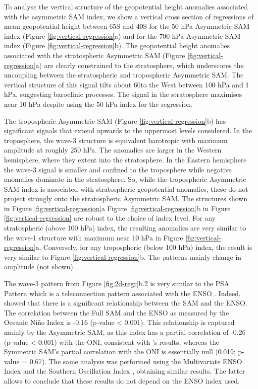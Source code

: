 \documentclass[smallextended]{svjour3}       %
\begin{document}
To analyse the vertical structure of the geopotential height anomalies associated with the asymmetric SAM index, we show a vertical cross section of regressions of mean geopotential height between 65\degree S and 40\degree S for the 50 hPa Asymmetric SAM index (Figure \ref{fig:vertical-regression}a) and for the 700 hPa Asymmetric SAM index (Figure \ref{fig:vertical-regression}b). The geopotential height anomalies associated with the stratospheric Asymmetric SAM (Figure \ref{fig:vertical-regression}a) are clearly constrained to the stratosphere, which underscores the uncoupling between the stratospheric and tropospheric Asymmetric SAM. The vertical structure of this signal tilts about 60\degree to the West between 100 hPa and 1 hPa, suggesting baroclinic processes. The signal in the stratosphere maximises near 10 hPa despite using the 50 hPa index for the regression.

The tropospheric Asymmetric SAM (Figure \ref{fig:vertical-regression}b) has significant signals that extend upwards to the uppermost levels considered. In the troposphere, the wave-3 structure is equivalent barotropic with maximum amplitude at roughly 250 hPa. The anomalies are larger in the Western hemisphere, where they extent into the stratosphere. In the Eastern hemisphere the wave-3 signal is smaller and confined to the troposphere while negative anomalies dominate in the stratosphere. So, while the tropospheric Asymmetric SAM index is associated with stratospheric geopotential anomalies, these do not project strongly onto the stratospheric Asymmetric SAM. The structures shown in Figure \ref{fig:vertical-regression}a Figure \ref{fig:vertical-regression}b in Figure \ref{fig:vertical-regression} are robust to the choice of index level. For any stratospheric (above 100 hPa) index, the resulting anomalies are very similar to the wave-1 structure with maximum near 10 hPa in Figure \ref{fig:vertical-regression}a. Conversely, for any tropospheric (below 100 hPa) index, the result is very similar to Figure \ref{fig:vertical-regression}b. The patterns mainly change in amplitude (not shown).

The wave-3 pattern from Figure \ref{fig:2d-regr}b.2 is very similar to the PSA Pattern \citep{mo1987, kidson1988} which is a teleconnection pattern associated with the ENSO \citep{karoly1989}. Indeed, \citet{fogt2011} showed that there is a significant relationship between the SAM and the ENSO. The correlation between the Full SAM and the ENSO as measured by the Oceanic Niño Index \citep[ONI,][]{bamston1997} is -0.16 (p-value \textless{} 0.001). This relationship is captured mainly by the Asymmetric SAM, as this index has a partial correlation of -0.26 (p-value \textless{} 0.001) with the ONI, consistent with \citet{fan2007}'s results, whereas the Symmetric SAM's partial correlation with the ONI is essentially null (0.019; p-value = 0.67). The same analysis was performed using the Multivariate ENSO Index \citep{wolter2011} and the Southern Oscillation Index \citep{ropelewski1987}, obtaining similar results. The latter allows to conclude that these results do not depend on the ENSO index used.
\end{document}

